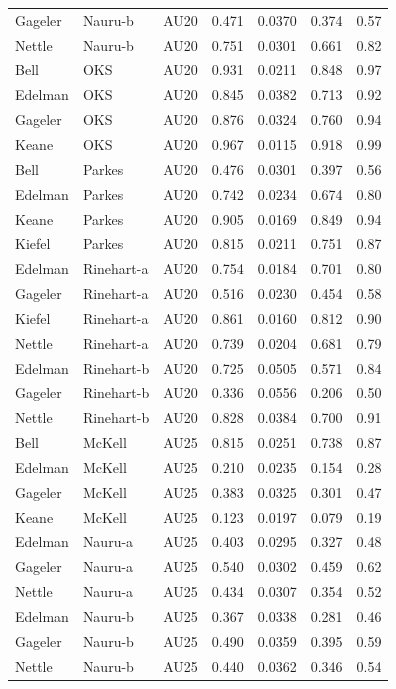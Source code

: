 \documentclass{monashthesis}
\begin{document}
\begin{center}
\begin{longtable}{lllllll}
Gageler & Nauru-b & AU20 & 0.471 & 0.0370 & 0.374 & 0.57 \\
Nettle & Nauru-b & AU20 & 0.751 & 0.0301 & 0.661 & 0.82 \\
Bell & OKS & AU20 & 0.931 & 0.0211 & 0.848 & 0.97 \\
Edelman & OKS & AU20 & 0.845 & 0.0382 & 0.713 & 0.92 \\
Gageler & OKS & AU20 & 0.876 & 0.0324 & 0.760 & 0.94 \\
Keane & OKS & AU20 & 0.967 & 0.0115 & 0.918 & 0.99 \\
Bell & Parkes & AU20 & 0.476 & 0.0301 & 0.397 & 0.56 \\
Edelman & Parkes & AU20 & 0.742 & 0.0234 & 0.674 & 0.80 \\
Keane & Parkes & AU20 & 0.905 & 0.0169 & 0.849 & 0.94 \\
Kiefel & Parkes & AU20 & 0.815 & 0.0211 & 0.751 & 0.87 \\
Edelman & Rinehart-a & AU20 & 0.754 & 0.0184 & 0.701 & 0.80 \\
Gageler & Rinehart-a & AU20 & 0.516 & 0.0230 & 0.454 & 0.58 \\
Kiefel & Rinehart-a & AU20 & 0.861 & 0.0160 & 0.812 & 0.90 \\
Nettle & Rinehart-a & AU20 & 0.739 & 0.0204 & 0.681 & 0.79 \\
Edelman & Rinehart-b & AU20 & 0.725 & 0.0505 & 0.571 & 0.84 \\
Gageler & Rinehart-b & AU20 & 0.336 & 0.0556 & 0.206 & 0.50 \\
Nettle & Rinehart-b & AU20 & 0.828 & 0.0384 & 0.700 & 0.91 \\
Bell & McKell & AU25 & 0.815 & 0.0251 & 0.738 & 0.87 \\
Edelman & McKell & AU25 & 0.210 & 0.0235 & 0.154 & 0.28 \\
Gageler & McKell & AU25 & 0.383 & 0.0325 & 0.301 & 0.47 \\
Keane & McKell & AU25 & 0.123 & 0.0197 & 0.079 & 0.19 \\
Edelman & Nauru-a & AU25 & 0.403 & 0.0295 & 0.327 & 0.48 \\
Gageler & Nauru-a & AU25 & 0.540 & 0.0302 & 0.459 & 0.62 \\
Nettle & Nauru-a & AU25 & 0.434 & 0.0307 & 0.354 & 0.52 \\
Edelman & Nauru-b & AU25 & 0.367 & 0.0338 & 0.281 & 0.46 \\
Gageler & Nauru-b & AU25 & 0.490 & 0.0359 & 0.395 & 0.59 \\
Nettle & Nauru-b & AU25 & 0.440 & 0.0362 & 0.346 & 0.54 \\

\end{longtable}
\end{center}
\end{document}

